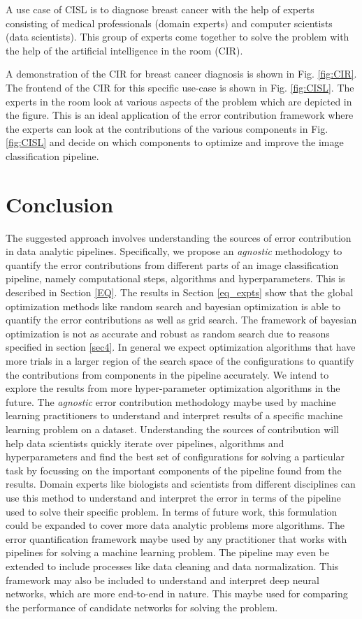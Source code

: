 A use case of CISL is to diagnose breast cancer with the help of experts consisting of medical professionals (domain experts) and computer scientists (data scientists). This group of experts come together to solve the problem with the help of the artificial intelligence in the room (CIR). 


A demonstration of the CIR for breast cancer diagnosis is shown in Fig. \ref{fig:CIR}. The frontend of the CIR for this specific use-case is shown in Fig. \ref{fig:CISL}. The experts in the room look at various aspects of the problem which are depicted in the figure. This is an ideal application of the error contribution framework where the experts can look at the contributions of the various components in Fig. \ref{fig:CISL} and decide on which components to optimize and improve the image classification pipeline.

\section{Conclusion}
  The suggested approach involves understanding the sources of error contribution in data analytic pipelines. Specifically, we propose an \textit{agnostic} methodology to quantify the error contributions from different parts of an image classification pipeline, namely computational steps, algorithms and hyperparameters. This is described in Section \ref{EQ}. The results in Section \ref{eq_expts} show that the global optimization methods like random search and bayesian optimization is able to quantify the error contributions as well as grid search. The framework of bayesian optimization is not as accurate and robust as random search due to reasons specified in section \ref{sec4}. In general we expect optimization algorithms that have more trials in a larger region of the search space of the configurations to quantify the contributions from components in the pipeline accurately. We intend to explore the results from more hyper-parameter optimization algorithms in the future. 
The \textit{agnostic} error contribution methodology maybe used by machine learning practitioners to understand and interpret results of a specific machine learning problem on a dataset. Understanding the sources of contribution will help data scientists quickly iterate over pipelines, algorithms and hyperparameters and find the best set of configurations for solving a particular task by focussing on the important components of the pipeline found from the results. Domain experts like biologists and scientists from different disciplines can use this method to understand and interpret the error in terms of the pipeline used to solve their specific problem.
In terms of future work, this formulation could be expanded to cover more data analytic problems more algorithms. The error quantification framework maybe used by any practitioner that works with pipelines for solving a machine learning problem. The pipeline may even be extended to include processes like data cleaning and data normalization. This framework may also be included to understand and interpret deep neural networks, which are more end-to-end in nature. This maybe used for comparing the performance of candidate networks for solving the problem.

\label{sec5}